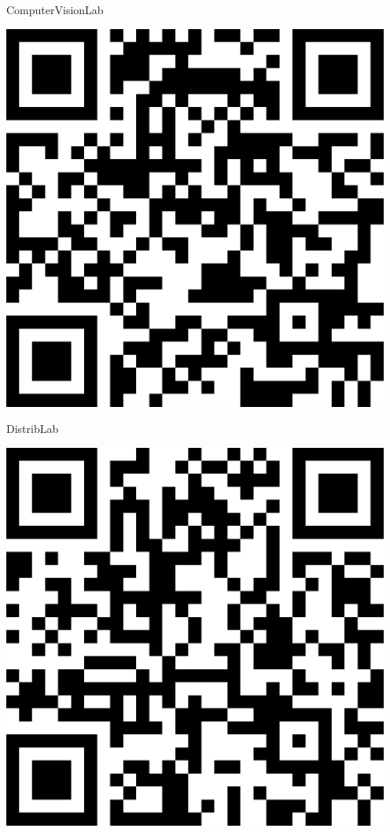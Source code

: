 \documentclass[letterpaper]{article}
\begin{document}
 \hfill{\small ComputerVisionLab} 

 \vspace{1in} 
 \pagebreak 
{} 
 \vspace*{\fill} 
 \begingroup 
 \centerline{\includegraphics[scale=1,width=5in,height=5in]{DistribLab.png}} 
 \endgroup 
 \vspace*{\fill} 

 \hfill{\small DistribLab} 

 \vspace{1in} 
 \pagebreak 
{} 
 \vspace*{\fill} 
 \begingroup 
 \centerline{\includegraphics[scale=1,width=5in,height=5in]{GradCenter.png}} 
 \endgroup 
 \vspace*{\fill} 
\end{document}
